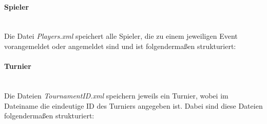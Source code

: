 \documentclass[11pt]{article}
\newcommand{\subsubsubsection}[1]{\paragraph{#1}\mbox{}\\}
\begin{document}
\subsubsubsection{Spieler}

Die Datei \textit{Players.xml} speichert alle Spieler, die zu einem jeweiligen Event vorangemeldet oder angemeldet sind und ist folgendermaßen strukturiert:
\vspace{0.4cm}


\subsubsubsection{Turnier}

Die Dateien \textit{TournamentID.xml} speichern jeweils ein Turnier, wobei im Dateiname die eindeutige ID des Turniers angegeben ist. Dabei sind diese Dateien folgendermaßen strukturiert:
\vspace{0.4cm}
\end{document}
